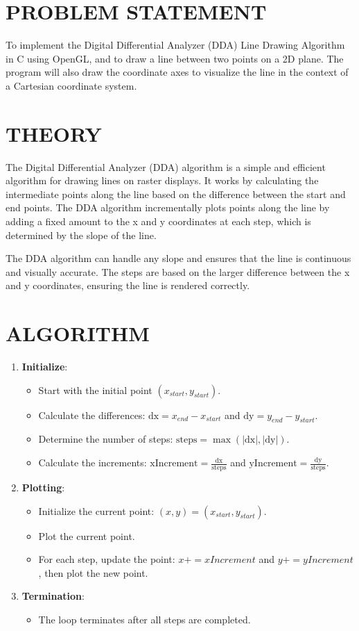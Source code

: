 \documentclass{article}
\begin{document}
\section*{PROBLEM STATEMENT}
To implement the Digital Differential Analyzer (DDA) Line Drawing Algorithm in C using OpenGL, and to draw a line between two points on a 2D plane. The program will also draw the coordinate axes to visualize the line in the context of a Cartesian coordinate system.

\section*{THEORY}
The Digital Differential Analyzer (DDA) algorithm is a simple and efficient algorithm for drawing lines on raster displays. It works by calculating the intermediate points along the line based on the difference between the start and end points. The DDA algorithm incrementally plots points along the line by adding a fixed amount to the x and y coordinates at each step, which is determined by the slope of the line.

The DDA algorithm can handle any slope and ensures that the line is continuous and visually accurate. The steps are based on the larger difference between the x and y coordinates, ensuring the line is rendered correctly.

\section*{ALGORITHM}
\begin{enumerate}
    \item \textbf{Initialize}:
    \begin{itemize}
        \item Start with the initial point $(x_{start}, y_{start})$.
        \item Calculate the differences: $\text{dx} = x_{end} - x_{start}$ and $\text{dy} = y_{end} - y_{start}$.
        \item Determine the number of steps: $\text{steps} = \max(|\text{dx}|, |\text{dy}|)$.
        \item Calculate the increments: $\text{xIncrement} = \frac{\text{dx}}{\text{steps}}$ and $\text{yIncrement} = \frac{\text{dy}}{\text{steps}}$.
    \end{itemize}
    \item \textbf{Plotting}:
    \begin{itemize}
        \item Initialize the current point: $(x, y) = (x_{start}, y_{start})$.
        \item Plot the current point.
        \item For each step, update the point: $x += xIncrement$ and $y += yIncrement$, then plot the new point.
    \end{itemize}
    \item \textbf{Termination}:
    \begin{itemize}
        \item The loop terminates after all steps are completed.
    \end{itemize}
\end{enumerate}
\end{document}
